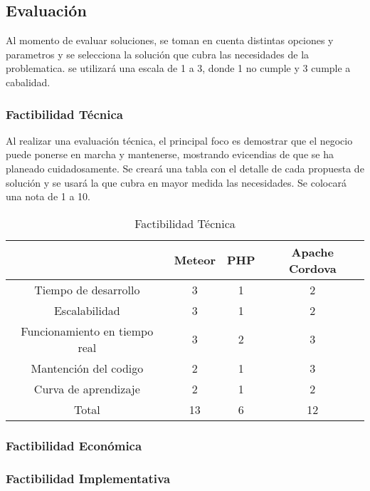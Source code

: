 \documentclass[letterpaper,openright,10pt,oneside]{report}
\begin{document}
			\subsection{Evaluación}
				Al momento de evaluar soluciones, se toman en cuenta distintas opciones y parametros y se selecciona la solución que cubra las necesidades de la problematica. se utilizará una escala de 1 a 3, donde 1 no cumple y 3 cumple a cabalidad.
				\subsubsection{Factibilidad Técnica}
				Al realizar una evaluación técnica, el principal foco es demostrar que el negocio puede ponerse en marcha y mantenerse, mostrando evicendias de que se ha planeado cuidadosamente. Se creará una tabla con el detalle de cada propuesta de solución y se usará la que cubra en mayor medida las necesidades. Se colocará una nota de 1 a 10.

				\begin{table}[h]
					\centering
						\begin{tabular}{|c|c|c|c|}
\hline
	 & Meteor & PHP & Apache Cordova\\
\hline
	Tiempo de desarrollo 			& 3 & 1 & 2\\
\hline
	Escalabilidad 		 & 3 & 1 & 2\\
\hline
	Funcionamiento en tiempo real & 3 & 2 & 3\\
\hline
	Mantención del codigo & 2 & 1 & 3\\
\hline
	Curva de aprendizaje & 2 & 1 & 2\\
\hline
	Total & 13 & 6 & 12 \\
\hline
\end{tabular}
	\caption{Factibilidad Técnica}
	\label{tab:factibilidadtecnica}
				\end{table}
				
				


				
				
				\subsubsection{Factibilidad Económica}
				\subsubsection{Factibilidad Implementativa}
\end{document}
